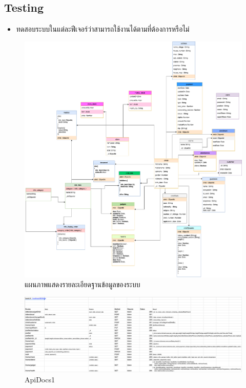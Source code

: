 \subsection{Testing}
\begin{itemize}
  \item ทดสอบระบบในแต่ละฟีเจอร์ว่าสามารถใช้งานได้ตามที่ต้องการหรือไม่
\end{itemize}

\begin{landscape}
  \begin{figure}
    \begin{center}
    \includegraphics[height=0.9\textheight]{images/NurseryDiagram.png}
    \end{center}
  \caption{แผนภาพแสดงรายละเอียดฐานข้อมูลของระบบ}
  \label{fig:DatabaseDiagram}
\end{figure}
\end{landscape}

\begin{figure}
  \begin{center}
    \includegraphics[width=\linewidth]{images/ApiDocOne.png}
  \end{center}
  \caption[ตารางแสดง API Document 1]{ApiDocs1}
  \label{fig:ApiDocs1}
\end{figure}

